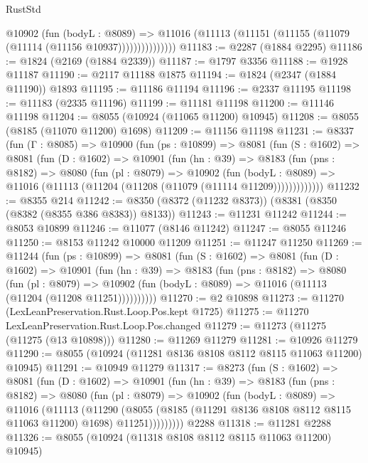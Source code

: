 \begin{lexlean}{RustStd}
\begin{coremodule}
                  @10902
                    (fun (bodyL : @8089) =>
                    @11016 (@11113 (@11151 (@11155 (@11079 (@11114 (@11156 @10937)))))))))))))))
@11183 := @2287 (@1884 @2295)
@11186 := @1824 (@2169 (@1884 @2339))
@11187 := @1797 @3356
@11188 := @1928 @11187
@11190 := @2117 @11188 @1875
@11194 := @1824 (@2347 (@1884 @11190)) @1893
@11195 := @11186 @11194
@11196 := @2337 @11195
@11198 := @11183 (@2335 @11196)
@11199 := @11181 @11198
@11200 := @11146 @11198
@11204 := @8055 (@10924 (@11065 @11200) @10945)
@11208 := @8055 (@8185 (@11070 @11200) @1698)
@11209 := @11156 @11198
@11231 := @8337
    (fun (Γ : @8085) =>
    @10900
      (fun (ps : @10899) =>
      @8081
        (fun (S : @1602) =>
        @8081
          (fun (D : @1602) =>
          @10901
            (fun (hn : @39) =>
            @8183
              (fun (pns : @8182) =>
              @8080
                (fun (pl : @8079) =>
                @10902
                  (fun (bodyL : @8089) =>
                  @11016 (@11113 (@11204 (@11208 (@11079 (@11114 @11209)))))))))))))
@11232 := @8355 @214
@11242 := @8350 (@8372 (@11232 @8373)) (@8381 (@8350 (@8382 (@8355 @386 @8383)) @8133))
@11243 := @11231 @11242
@11244 := @8053 @10899
@11246 := @11077 (@8146 @11242)
@11247 := @8055 @11246
@11250 := @8153 @11242 @10000 @11209
@11251 := @11247 @11250
@11269 := @11244
    (fun (ps : @10899) =>
    @8081
      (fun (S : @1602) =>
      @8081
        (fun (D : @1602) =>
        @10901
          (fun (hn : @39) =>
          @8183
            (fun (pns : @8182) =>
            @8080
              (fun (pl : @8079) =>
              @10902 (fun (bodyL : @8089) => @11016 (@11113 (@11204 (@11208 @11251))))))))))
@11270 := @2 @10898
@11273 := @11270 (LexLeanPreservation.Rust.Loop.Pos.kept @1725)
@11275 := @11270 LexLeanPreservation.Rust.Loop.Pos.changed
@11279 := @11273 (@11275 (@11275 (@13 @10898)))
@11280 := @11269 @11279
@11281 := @10926 @11279
@11290 := @8055 (@10924 (@11281 @8136 @8108 @8112 @8115 @11063 @11200) @10945)
@11291 := @10949 @11279
@11317 := @8273
    (fun (S : @1602) =>
    @8081
      (fun (D : @1602) =>
      @10901
        (fun (hn : @39) =>
        @8183
          (fun (pns : @8182) =>
          @8080
            (fun (pl : @8079) =>
            @10902
              (fun (bodyL : @8089) =>
              @11016
                (@11113
                  (@11290
                    (@8055
                      (@8185 (@11291 @8136 @8108 @8112 @8115 @11063 @11200) @1698)
                      @11251)))))))))
    @2288
@11318 := @11281 @2288
@11326 := @8055 (@10924 (@11318 @8108 @8112 @8115 @11063 @11200) @10945)

\end{coremodule}
\end{lexlean}
